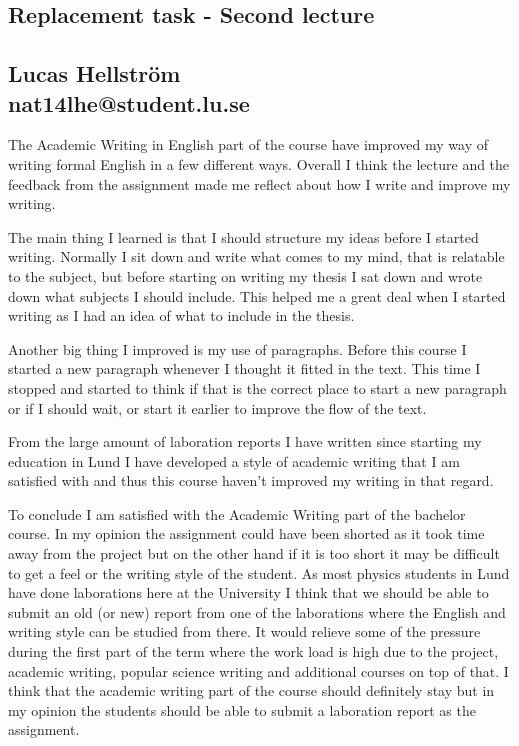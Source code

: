 \documentclass[titlepage]{article}
\begin{document}
\begin{center}
\section*{Replacement task - Second lecture}
	\subsection*{Lucas Hellström \\ \small{nat14lhe@student.lu.se}}
\end{center}	
		The Academic Writing in English part of the course have improved my way of writing formal English in a few different ways. Overall I think the lecture and the feedback from the assignment made me reflect about how I write and improve my writing. \vspace{0.3cm}
		
		\noindent The main thing I learned is that I should structure my ideas before I started writing. Normally I sit down and write what comes to my mind, that is relatable to the subject, but before starting on writing my thesis I sat down and wrote down what subjects I should include. This helped me a great deal when I started writing as I had an idea of what to include in the thesis.\vspace{0.3cm}
		
		\noindent Another big thing I improved is my use of paragraphs. Before this course I started a new paragraph whenever I thought it fitted in the text. This time I stopped and started to think if that is the correct place to start a new paragraph or if I should wait, or start it earlier to improve the flow of the text. \vspace{0.3cm}
		
		\noindent From the large amount of laboration reports I have written since starting my education in Lund I have developed a style of academic writing that I am satisfied with and thus this course haven't improved my writing in that regard. \vspace{0.3cm}

		\noindent To conclude I am satisfied with the Academic Writing part of the bachelor course. In my opinion the assignment could have been shorted as it took time away from the project but on the other hand if it is too short it may be difficult to get a feel or the writing style of the student. As most physics students in Lund have done laborations here at the University I think that we should be able to submit an old (or new) report from one of the laborations where the English and writing style can be studied from there. It would relieve some of the pressure during the first part of the term where the work load is high due to the project, academic writing, popular science writing and additional courses on top of that. I think that the academic writing part of the course should definitely stay but in my opinion the students should be able to submit a laboration report as the assignment.
\end{document}
